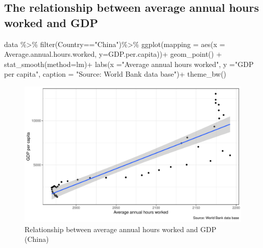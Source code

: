 \documentclass[11pt,a4paper,]{article}
\newenvironment{Shaded}{\begin{snugshade}}{\end{snugshade}}
\newcommand{\AttributeTok}[1]{\textcolor[rgb]{0.77,0.63,0.00}{#1}}
\newcommand{\FunctionTok}[1]{\textcolor[rgb]{0.00,0.00,0.00}{#1}}
\newcommand{\NormalTok}[1]{#1}
\newcommand{\SpecialCharTok}[1]{\textcolor[rgb]{0.00,0.00,0.00}{#1}}
\newcommand{\StringTok}[1]{\textcolor[rgb]{0.31,0.60,0.02}{#1}}
\begin{document}
\hypertarget{the-relationship-between-average-annual-hours-worked-and-gdp}{%
\subsection{The relationship between average annual hours worked and GDP}\label{the-relationship-between-average-annual-hours-worked-and-gdp}}

\begin{Shaded}
\begin{Highlighting}[]
\NormalTok{data }\SpecialCharTok{\%\textgreater{}\%}
    \FunctionTok{filter}\NormalTok{(Country}\SpecialCharTok{==}\StringTok{"China"}\NormalTok{)}\SpecialCharTok{\%\textgreater{}\%}
    \FunctionTok{ggplot}\NormalTok{(}\AttributeTok{mapping =} \FunctionTok{aes}\NormalTok{(}\AttributeTok{x =}\NormalTok{ Average.annual.hours.worked,}
                          \AttributeTok{y=}\NormalTok{GDP.per.capita))}\SpecialCharTok{+}
    \FunctionTok{geom\_point}\NormalTok{() }\SpecialCharTok{+} 
    \FunctionTok{stat\_smooth}\NormalTok{(}\AttributeTok{method=}\NormalTok{lm)}\SpecialCharTok{+}
  \FunctionTok{labs}\NormalTok{(}\AttributeTok{x =}\StringTok{"Average annual hours worked"}\NormalTok{, }
       \AttributeTok{y =}\StringTok{"GDP per capita"}\NormalTok{, }
       \AttributeTok{caption =} \StringTok{"Source: World Bank data base"}\NormalTok{)}\SpecialCharTok{+}
    \FunctionTok{theme\_bw}\NormalTok{()}
\end{Highlighting}
\end{Shaded}

\begin{figure}
\centering
\includegraphics{report_files/figure-latex/Figure3-1.pdf}
\caption{\label{fig:Figure3}Relationship between average annual hours worked and GDP (China)}
\end{figure}
\end{document}

